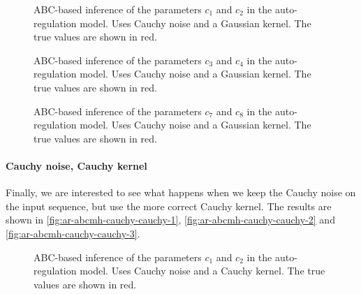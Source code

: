 \begin{figure}[htp]%
    \centering
    \qquad
    \caption{ABC-based inference of the parameters $c_1$ and $c_2$ in the auto-regulation model. Uses Cauchy noise and a Gaussian kernel. The true values are shown in red.}%
    \label{fig:ar-abcmh-cauchy-gauss-1}%
\end{figure}

\begin{figure}[htp]%
    \centering
    \qquad
    \caption{ABC-based inference of the parameters $c_3$ and $c_4$ in the auto-regulation model. Uses Cauchy noise and a Gaussian kernel. The true values are shown in red.}%
    \label{fig:ar-abcmh-cauchy-gauss-2}%
\end{figure}

\begin{figure}[htp]%
    \centering
    \qquad
    \caption{ABC-based inference of the parameters $c_7$ and $c_8$ in the auto-regulation model. Uses Cauchy noise and a Gaussian kernel. The true values are shown in red.}%
    \label{fig:ar-abcmh-cauchy-gauss-3}%
\end{figure}

\paragraph{Cauchy noise, Cauchy kernel}
Finally, we are interested to see what happens when we keep the Cauchy noise on the input sequence, but use the more correct Cauchy kernel. The results are shown in \autoref{fig:ar-abcmh-cauchy-cauchy-1}, \autoref{fig:ar-abcmh-cauchy-cauchy-2} and \autoref{fig:ar-abcmh-cauchy-cauchy-3}.

\begin{figure}[htp]%
    \centering
    \qquad
    \caption{ABC-based inference of the parameters $c_1$ and $c_2$ in the auto-regulation model. Uses Cauchy noise and a Cauchy kernel. The true values are shown in red.}%
    \label{fig:ar-abcmh-cauchy-cauchy-1}%
\end{figure}

